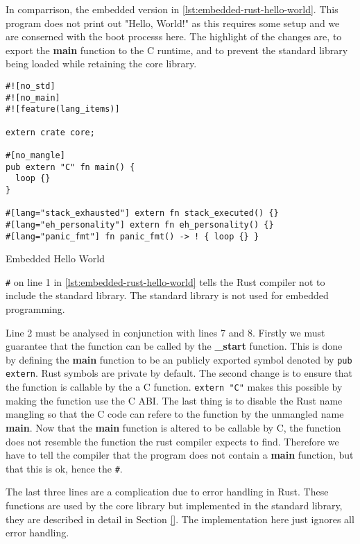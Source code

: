 In comparrison, the embedded version in \autoref{lst:embedded-rust-hello-world}.
This program does not print out "Hello, World!" as this requires some setup and we are conserned with the boot processs here.
The highlight of the changes are, to export the \textbf{main} function to the C runtime, and to prevent the standard library being loaded while retaining the core library.

\begin{listing}[H]
\begin{verbatim}
#![no_std]
#![no_main]
#![feature(lang_items)]

extern crate core;

#[no_mangle]
pub extern "C" fn main() {
  loop {}
}

#[lang="stack_exhausted"] extern fn stack_executed() {}
#[lang="eh_personality"] extern fn eh_personality() {}
#[lang="panic_fmt"] fn panic_fmt() -> ! { loop {} }
\end{verbatim}
\caption{Embedded Hello World}
\label{lst:embedded-rust-hello-world}
\end{listing}

\texttt{\#\![no\_std]} on line 1 in \autoref{lst:embedded-rust-hello-world} tells the Rust compiler not to include the standard library.
The standard library is not used for embedded programming. 

Line 2 must be analysed in conjunction with lines 7 and 8.
Firstly we must guarantee that the function can be called by the \textbf{\_start} function.
This is done by defining the \textbf{main} function to be an publicly exported symbol denoted by \texttt{pub extern}.
Rust symbols are private by default.
The second change is to ensure that the function is callable by the a C function.
\texttt{extern "C"} makes this possible by making the function use the C ABI. 
The last thing is to disable the Rust name mangling so that the C code can refere to the function by the unmangled name \textbf{main}.
Now that the \textbf{main} function is altered to be callable by C, the function does not resemble the function the rust compiler expects to find.
Therefore we have to tell the compiler that the program does not contain a \textbf{main} function, but that this is ok, hence the \texttt{\#\![no\_main]}.

The last three lines are a complication due to error handling in Rust.
These functions are used by the core library but implemented in the standard library, they are described in detail in Section \ref{}. 
The implementation here just ignores all error handling.

